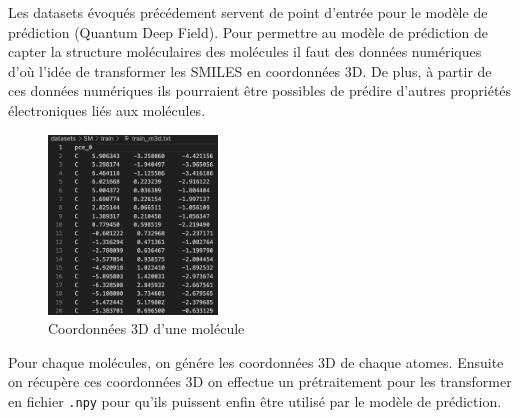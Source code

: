 Les datasets évoqués précédement servent de point d'entrée pour le modèle de prédiction (Quantum Deep Field).
Pour permettre au modèle de prédiction de capter la structure moléculaires des molécules il faut des données numériques d'où l'idée de transformer les SMILES en coordonnées 3D. 
De plus, à partir de ces données numériques ils pourraient être possibles de prédire d'autres propriétés électroniques liés aux molécules. 

\begin{figure}[H]
    \centering
    \includegraphics[width=0.4\textwidth]{Datasets/coords.png}
    \caption{Coordonnées 3D d'une molécule}
\end{figure}

Pour chaque molécules, on génére les coordonnées 3D de chaque atomes.
Ensuite on récupère ces coordonnées 3D on effectue un prétraitement  pour les transformer en fichier \texttt{.npy} pour qu'ils puissent enfin être utilisé par le modèle de prédiction.


